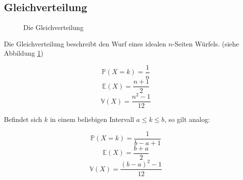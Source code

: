 {    \subsection{Gleichverteilung}\label{sec:gleichverteilung_diskret}

    {
        \begin{figure}
            \def\bval{10}
            \def\aval{2}
            \subfigure[Wahrscheinlichkeitsfunktion]{
                \begin{tikzpicture}
                                
                \end{tikzpicture}
                \label{fig:gleich_dist_a}
            }
            \subfigure[Gleichverteilung]{
                \begin{tikzpicture}
                                
                \end{tikzpicture}
                \label{fig:gleich_dist_b}
            }
            \caption{Die Gleichverteilung}
            \label{fig:gleich_dist}
        \end{figure}
    }

    \begin{bsp}
    Die Gleichverteilung beschreibt den Wurf eines idealen $n$-Seiten Würfels. (siehe Abbildung \ref{fig:gleich_dist})
    \end{bsp}

    \begin{definition}
    \[\mathbb P\left(X=k\right)=\frac{1}{n}\]
    \[\mathbb E\left(X\right)=\frac{n+1}{2}\]
    \[\mathbb V\left(X\right)=\frac{n^{2}-1}{12}\]
    \end{definition}
    
    Befindet sich $k$ in einem beliebigen Intervall $a\leq k\le b$, so gilt analog:

    \[\mathbb P\left(X=k\right)=\frac{1}{b-a+1}\]
    \[\mathbb E\left(X\right)=\frac{b+a}{2}\]
    \[\mathbb V\left(X\right)=\frac{\left(b-a\right)^{2}-1}{12}\]
    
}
